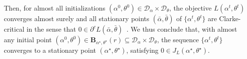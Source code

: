 \documentclass[11pt]{article}
\newcommand{\bsnote}[1]{\noindent\textcolor{red}{\texttt{Bartolomeo: #1}}}
\begin{document}
\begin{appendices}
Then, for almost all initializations $(\alpha^0,\theta^0) \in \mathcal{D}_\alpha \times \mathcal{D}_\theta$, the objective $L(\alpha^t,\theta^t)$ converges almost surely and all stationary points $(\bar{\alpha},\bar{\theta})$ of $\{\alpha^t,\theta^t\}$ are Clarke-critical in the sense that $0 \in \partial^c L(\bar{\alpha},\bar{\theta})$~\citep{path-diff}.
We thus conclude that, with almost any initial point $(\alpha^0,\theta^0) \in \mathbf{B}_{\alpha^\star,\theta^\star}(r) \subseteq  \mathcal{D}_\alpha \times \mathcal{D}_\theta$, the sequence $\{\alpha^t,\theta^t\}$ converges to a stationary point $(\alpha^\star,\theta^\star)$, satisfying $0 \in J_L(\alpha^{\star},\theta^{\star})$.

\end{appendices}
\end{document}
